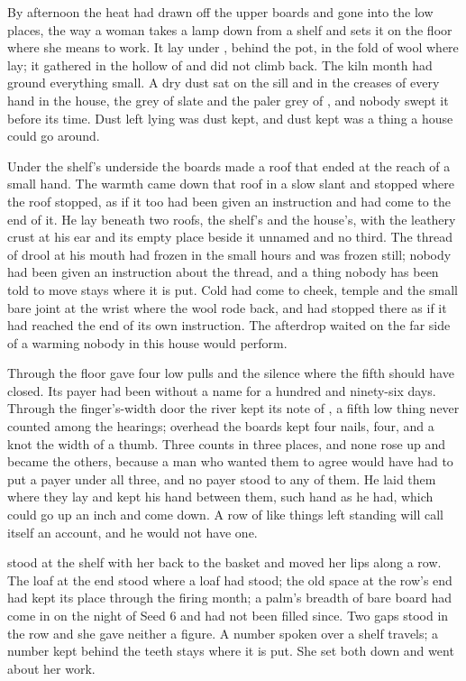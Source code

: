 By afternoon the heat had drawn off the upper boards and gone into the low places, the way a woman takes a lamp down from a shelf and sets it on the floor where she means to work. It lay under , behind the pot, in the fold of wool where  lay; it gathered in the hollow of  and did not climb back. The kiln month had ground everything small. A dry dust sat on the sill and in the creases of every hand in the house, the grey of slate and the paler grey of , and nobody swept it before its time. Dust left lying was dust kept, and dust kept was a thing a house could go around.

Under the shelf's underside the boards made a roof that ended at the reach of a small hand. The warmth came down that roof in a slow slant and stopped where the roof stopped, as if it too had been given an instruction and had come to the end of it. He lay beneath two roofs, the shelf's and the house's, with the leathery crust at his ear and its empty place beside it unnamed and no third. The thread of drool at his mouth had frozen in the small hours and was frozen still; nobody had been given an instruction about the thread, and a thing nobody has been told to move stays where it is put. Cold had come to cheek, temple and the small bare joint at the wrist where the wool rode back, and had stopped there as if it had reached the end of its own instruction. The afterdrop waited on the far side of a warming nobody in this house would perform.

Through the floor  gave four low pulls and the silence where the fifth should have closed. Its payer had been without a name for a hundred and ninety-six days. Through the finger's-width door the river kept its note of , a fifth low thing never counted among the hearings; overhead the boards kept four nails, four, and a knot the width of a thumb. Three counts in three places, and none rose up and became the others, because a man who wanted them to agree would have had to put a payer under all three, and no payer stood to any of them. He laid them where they lay and kept his hand between them, such hand as he had, which could go up an inch and come down. A row of like things left standing will call itself an account, and he would not have one.

 stood at the shelf with her back to the basket and moved her lips along a row. The loaf at the end stood where a loaf had stood; the old space at the row's end had kept its place through the firing month; a palm's breadth of bare board had come in on the night of Seed 6 and had not been filled since. Two gaps stood in the row and she gave neither a figure. A number spoken over a shelf travels; a number kept behind the teeth stays where it is put. She set both down and went about her work.

